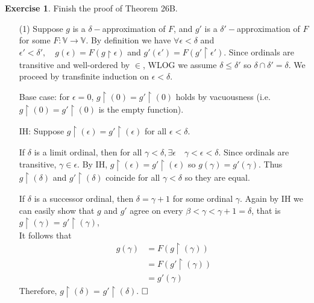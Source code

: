 \documentclass{article}
\theoremstyle{definition}
\newtheorem{exercise}{Exercise}[section]
\newcommand{\so}{\text{\textbf{Solution: }}}
\newcommand{\es}{$\hfill \square$}
\begin{document}
    \begin{exercise}
        Finish the proof of Theorem 26B.\vspace{1em}\\
        \so \begin{itemize}
            \item[(1)] Suppose $g$ is a $\delta-$approximation of $F$, and $g'$ is a $\delta'-$approximation of $F$ for some $F: \mathbb{V} \rightarrow \mathbb{V}$. By definition we have $\forall \epsilon < \delta$ and $\epsilon' < \delta', \quad g(\epsilon) = F(g \upharpoonright \epsilon)$ and $g'(\epsilon') = F(g' \upharpoonright \epsilon')$. Since ordinals are transitive and well-ordered by $\in$, WLOG we assume $\delta \leq \delta'$ so $\delta \cap \delta' = \delta$. We proceed by transfinite induction on $\epsilon < \delta$.
            
            Base case: for $\epsilon = 0$, $g\upharpoonright(0) = g'\upharpoonright(0)$ holds by vacuousness (i.e. $g\upharpoonright(0) = g'\upharpoonright(0)$ is the empty function).

            IH: Suppose $g\upharpoonright(\epsilon) = g'\upharpoonright(\epsilon)$ for all $\epsilon < \delta$.

            If $\delta$ is a limit ordinal, then for all $\gamma < \delta, \exists \epsilon \quad \gamma < \epsilon < \delta$. Since ordinals are transitive, $\gamma \in \epsilon.$ By IH, $g\upharpoonright(\epsilon) = g'\upharpoonright(\epsilon)$ so $g(\gamma) = g'(\gamma)$. Thus $g\upharpoonright(\delta)$ and $ g'\upharpoonright(\delta)$ coincide for all $\gamma < \delta$ so they are equal.

            If $\delta$ is a successor ordinal, then $\delta = \gamma + 1$ for some ordinal $\gamma$. Again by IH we can easily show that $g$ and $g'$ agree on every $\beta < \gamma < \gamma + 1 = \delta$, that is $g \upharpoonright (\gamma)$ = $g'\upharpoonright (\gamma)$, \\
            It follows that 
            \begin{align*}
                g(\gamma) &= F(g \upharpoonright (\gamma)) \tag{$g$ is $\delta$-approximation of $F$}\\
               & = F(g' \upharpoonright (\gamma)) \tag{By IH and $F$ is a function}\\
                & = g'(\gamma)  \tag{$g'$ is $\delta$-approximation of $F$}
            \end{align*}
            Therefore, $g \upharpoonright (\delta)$ = $g'\upharpoonright (\delta)$. \es


\end{itemize}
\end{exercise}
\end{document}
